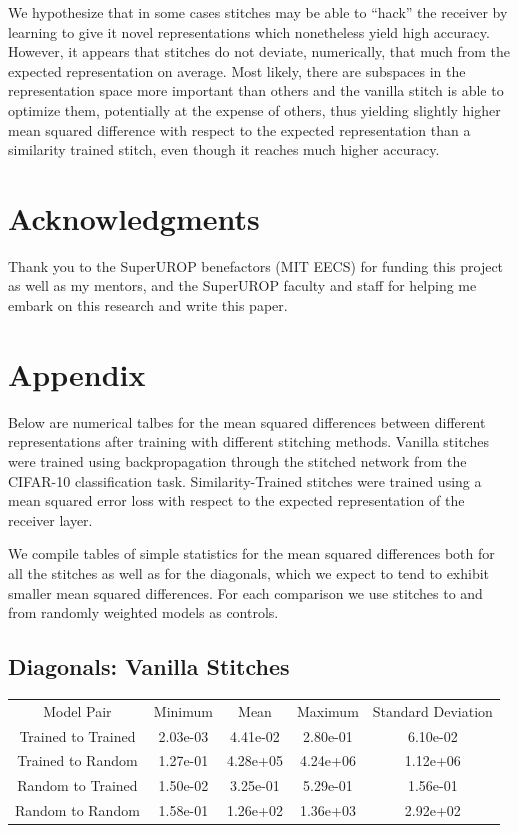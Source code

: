 \documentclass{article} %
\begin{document}
We hypothesize that in some cases
stitches may be able to ``hack'' the receiver by learning to give it novel representations which nonetheless yield high
accuracy. However, it appears that stitches do not deviate, numerically, that much from the expected representation on
average. Most likely, there are subspaces in the representation space more important than others and the vanilla stitch
is able to optimize them, potentially at the expense of others, thus yielding slightly higher mean squared difference with
respect to the expected representation than a similarity trained stitch, even though it reaches much higher accuracy.

\section*{Acknowledgments}
\label{Acknowledgments}
Thank you to the SuperUROP benefactors (MIT EECS) for funding this project as well as my mentors, and the
SuperUROP faculty and staff for helping me embark on this research and write this paper.
\newpage


\newpage
\appendix
\section{Appendix}
\label{Appendix}
Below are numerical talbes for the mean squared differences between different representations
after training with different stitching methods. Vanilla stitches were trained using backpropagation
through the stitched network from the CIFAR-10 classification task. Similarity-Trained stitches were
trained using a mean squared error loss with respect to the expected representation of the
receiver layer.

We compile tables of simple statistics for the mean squared differences both for all the stitches as well
as for the diagonals, which we expect to tend to exhibit smaller mean squared differences. For each comparison
we use stitches to and from randomly weighted models as controls.

\subsection*{Diagonals: Vanilla Stitches}
\label{Table1}
\begin{tabular}{c c c c c}
   Model Pair&Minimum&Mean&Maximum&Standard Deviation\\
   Trained to Trained&2.03e-03&4.41e-02&2.80e-01&6.10e-02\\
   Trained to Random&1.27e-01&4.28e+05&4.24e+06&1.12e+06\\
   Random to Trained&1.50e-02&3.25e-01&5.29e-01&1.56e-01\\
   Random to Random&1.58e-01&1.26e+02&1.36e+03&2.92e+02\\
\end{tabular}
\end{document}
